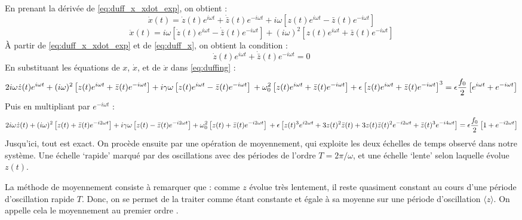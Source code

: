 En prenant la dérivée de \eqref{eq:duff_x_xdot_exp}, on obtient :
\begin{equation}
    \dot{x}(t) = \dot{z}(t)e^{i\omega t} + \dot{\bar{z}}(t) e^{-i\omega t} + i\omega \left[ z(t)e^{i\omega t} - \bar{z}(t) e^{-i\omega t} \right]
    \label{eq:duff_x}
\end{equation}
\begin{equation}
    \ddot{x}(t) = i\omega \left[ \dot{z}(t)e^{i\omega t} - \dot{\bar{z}}(t) e^{-i\omega t} \right] + (i\omega)^2 \left[ z(t)e^{i\omega t} + \bar{z}(t) e^{-i\omega t} \right]
\end{equation}
À partir de \eqref{eq:duff_x_xdot_exp} et de \eqref{eq:duff_x}, on obtient la condition :
\begin{equation}
    \dot{z}(t)e^{i\omega t} + \dot{\bar{z}}(t) e^{-i\omega t} = 0
\end{equation}
%
En substituant les équations de $x$, $\dot{x}$, et de $\ddot{x}$ dans \eqref{eq:duffing} :
%
\begin{dmath}
    2i\omega \dot{z}(t)e^{i\omega t} + (i\omega)^2 \left[ z(t)e^{i\omega t} + \bar{z}(t) e^{-i\omega t} \right]
    + i\gamma\omega \left[ z(t)e^{i\omega t} - \bar{z}(t) e^{-i\omega t} \right] \\
    + \omega_0^2 \left[ z(t)e^{i\omega t} + \bar{z}(t) e^{-i\omega t} \right]
    + \epsilon \left[ z(t)e^{i\omega t} + \bar{z}(t) e^{-i\omega t} \right]^3 = \epsilon \frac{f_0}{2}\left[ e^{i\omega t} + e^{-i\omega t} \right]
\end{dmath}
Puis en multipliant par $e^{-i\omega t}$ :
\begin{dmath}
    2i\omega \dot{z}(t) + (i\omega)^2 \left[ z(t) + \bar{z}(t) e^{-i 2 \omega t} \right]
    + i\gamma\omega \left[ z(t) - \bar{z}(t) e^{-i 2 \omega t} \right]
    + \omega_0^2 \left[ z(t) + \bar{z}(t) e^{-i 2 \omega t} \right] \\
    + \epsilon \left[ z(t)^3 e^{i 2 \omega t} + 3 z(t)^2 \bar{z}(t) + 3z(t)\bar{z}(t)^2 e^{-i2\omega t} + \bar{z}(t)^3 e^{-i4 \omega t} \right]
    = \epsilon \frac{f_0}{2}\left[ 1 + e^{-i 2 \omega t} \right]
    \label{eq:duff_pre_av}
\end{dmath}
%
%
%
Jusqu'ici, tout est exact. On procède ensuite par une opération de moyennement, qui exploite les deux échelles de temps observé dans notre système. 
Une échelle `rapide' marqué par des oscillations avec des périodes de l'ordre $T = 2\pi / \omega$, 
et une échelle `lente' selon laquelle évolue $z(t)$. 

La méthode de moyennement consiste à remarquer que : comme $z$ évolue très lentement, 
il reste quasiment constant au cours d'une période d'oscillation rapide $T$. 
Donc, on se permet de la traiter comme étant constante et égale à sa moyenne sur une période d'oscillation $\langle z \rangle$.
On appelle cela le moyennement au premier ordre \cite{rand_lecture_2012}.

